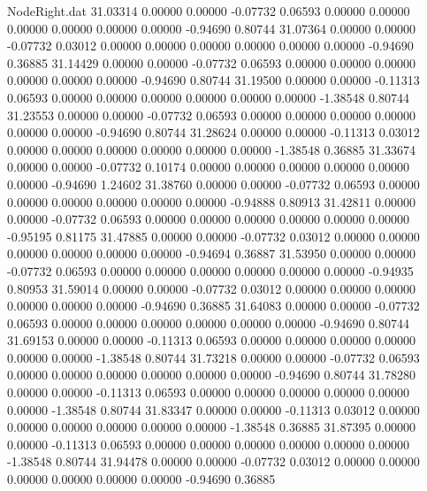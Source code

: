 \begin{filecontents}{NodeRight.dat}
  31.03314    0.00000    0.00000    -0.07732    0.06593    0.00000    0.00000    0.00000    0.00000    0.00000    0.00000   -0.94690    0.80744
  31.07364    0.00000    0.00000    -0.07732    0.03012    0.00000    0.00000    0.00000    0.00000    0.00000    0.00000   -0.94690    0.36885
  31.14429    0.00000    0.00000    -0.07732    0.06593    0.00000    0.00000    0.00000    0.00000    0.00000    0.00000   -0.94690    0.80744
  31.19500    0.00000    0.00000    -0.11313    0.06593    0.00000    0.00000    0.00000    0.00000    0.00000    0.00000   -1.38548    0.80744
  31.23553    0.00000    0.00000    -0.07732    0.06593    0.00000    0.00000    0.00000    0.00000    0.00000    0.00000   -0.94690    0.80744
  31.28624    0.00000    0.00000    -0.11313    0.03012    0.00000    0.00000    0.00000    0.00000    0.00000    0.00000   -1.38548    0.36885
  31.33674    0.00000    0.00000    -0.07732    0.10174    0.00000    0.00000    0.00000    0.00000    0.00000    0.00000   -0.94690    1.24602
  31.38760    0.00000    0.00000    -0.07732    0.06593    0.00000    0.00000    0.00000    0.00000    0.00000    0.00000   -0.94888    0.80913
  31.42811    0.00000    0.00000    -0.07732    0.06593    0.00000    0.00000    0.00000    0.00000    0.00000    0.00000   -0.95195    0.81175
  31.47885    0.00000    0.00000    -0.07732    0.03012    0.00000    0.00000    0.00000    0.00000    0.00000    0.00000   -0.94694    0.36887
  31.53950    0.00000    0.00000    -0.07732    0.06593    0.00000    0.00000    0.00000    0.00000    0.00000    0.00000   -0.94935    0.80953
  31.59014    0.00000    0.00000    -0.07732    0.03012    0.00000    0.00000    0.00000    0.00000    0.00000    0.00000   -0.94690    0.36885
  31.64083    0.00000    0.00000    -0.07732    0.06593    0.00000    0.00000    0.00000    0.00000    0.00000    0.00000   -0.94690    0.80744
  31.69153    0.00000    0.00000    -0.11313    0.06593    0.00000    0.00000    0.00000    0.00000    0.00000    0.00000   -1.38548    0.80744
  31.73218    0.00000    0.00000    -0.07732    0.06593    0.00000    0.00000    0.00000    0.00000    0.00000    0.00000   -0.94690    0.80744
  31.78280    0.00000    0.00000    -0.11313    0.06593    0.00000    0.00000    0.00000    0.00000    0.00000    0.00000   -1.38548    0.80744
  31.83347    0.00000    0.00000    -0.11313    0.03012    0.00000    0.00000    0.00000    0.00000    0.00000    0.00000   -1.38548    0.36885
  31.87395    0.00000    0.00000    -0.11313    0.06593    0.00000    0.00000    0.00000    0.00000    0.00000    0.00000   -1.38548    0.80744
  31.94478    0.00000    0.00000    -0.07732    0.03012    0.00000    0.00000    0.00000    0.00000    0.00000    0.00000   -0.94690    0.36885

\end{filecontents}

